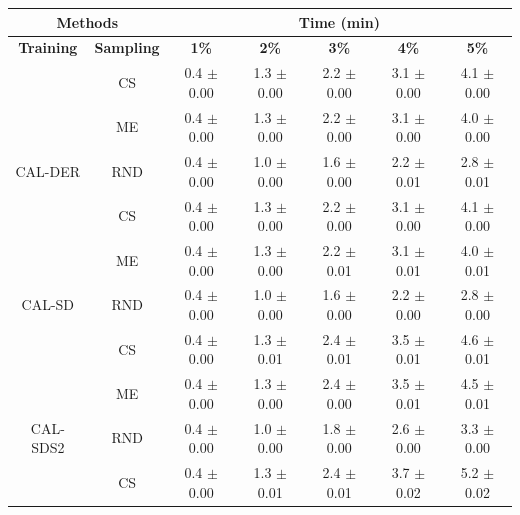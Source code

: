 \begin{table}[htbp]
\centering

\begin{tabular*}{\linewidth}{c|c|@{\extracolsep{\fill}}ccccc}
\toprule
\multicolumn{2}{c|}{\textbf{Methods}} & \multicolumn{5}{c}{\textbf{Time (min)}} \\
\midrule
\textbf{Training} & \textbf{Sampling} & \textbf{1\%} & \textbf{2\%} & \textbf{3\%} & \textbf{4\%} & \textbf{5\%}\\
\midrule
 & CS & 0.4 $\pm$ {\small 0.00} & 1.3 $\pm$ {\small 0.00} & 2.2 $\pm$ {\small 0.00} & 3.1 $\pm$ {\small 0.00} & 4.1 $\pm$ {\small 0.00}\\

 & ME & 0.4 $\pm$ {\small 0.00} & 1.3 $\pm$ {\small 0.00} & 2.2 $\pm$ {\small 0.00} & 3.1 $\pm$ {\small 0.00} & 4.0 $\pm$ {\small 0.00}\\

\multirow{-3}{*}{\raggedright\arraybackslash CAL-DER} & RND & 0.4 $\pm$ {\small 0.00} & 1.0 $\pm$ {\small 0.00} & 1.6 $\pm$ {\small 0.00} & 2.2 $\pm$ {\small 0.01} & 2.8 $\pm$ {\small 0.01}\\
\midrule
 & CS & 0.4 $\pm$ {\small 0.00} & 1.3 $\pm$ {\small 0.00} & 2.2 $\pm$ {\small 0.00} & 3.1 $\pm$ {\small 0.00} & 4.1 $\pm$ {\small 0.00}\\

 & ME & 0.4 $\pm$ {\small 0.00} & 1.3 $\pm$ {\small 0.00} & 2.2 $\pm$ {\small 0.01} & 3.1 $\pm$ {\small 0.01} & 4.0 $\pm$ {\small 0.01}\\

\multirow{-3}{*}{\raggedright\arraybackslash CAL-SD} & RND & 0.4 $\pm$ {\small 0.00} & 1.0 $\pm$ {\small 0.00} & 1.6 $\pm$ {\small 0.00} & 2.2 $\pm$ {\small 0.00} & 2.8 $\pm$ {\small 0.00}\\
\midrule
 & CS & 0.4 $\pm$ {\small 0.00} & 1.3 $\pm$ {\small 0.01} & 2.4 $\pm$ {\small 0.01} & 3.5 $\pm$ {\small 0.01} & 4.6 $\pm$ {\small 0.01}\\

 & ME & 0.4 $\pm$ {\small 0.00} & 1.3 $\pm$ {\small 0.00} & 2.4 $\pm$ {\small 0.00} & 3.5 $\pm$ {\small 0.01} & 4.5 $\pm$ {\small 0.01}\\

\multirow{-3}{*}{\raggedright\arraybackslash CAL-SDS2} & RND & 0.4 $\pm$ {\small 0.00} & 1.0 $\pm$ {\small 0.00} & 1.8 $\pm$ {\small 0.00} & 2.6 $\pm$ {\small 0.00} & 3.3 $\pm$ {\small 0.00}\\
\midrule
 & CS & 0.4 $\pm$ {\small 0.00} & 1.3 $\pm$ {\small 0.01} & 2.4 $\pm$ {\small 0.01} & 3.7 $\pm$ {\small 0.02} & 5.2 $\pm$ {\small 0.02}\\


\end{tabular*}
\end{table}
